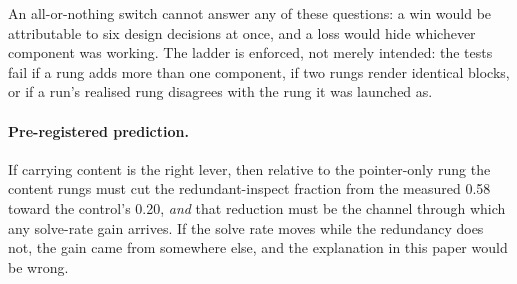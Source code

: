 An all-or-nothing switch cannot answer any of these questions: a win would be
attributable to six design decisions at once, and a loss would hide whichever
component was working. The ladder is enforced, not merely intended: the tests
fail if a rung adds more than one component, if two rungs render identical
blocks, or if a run's realised rung disagrees with the rung it was launched
as\code.

\paragraph{Pre-registered prediction.} If carrying content is the right
lever, then relative to the pointer-only rung the content rungs must cut the
redundant-inspect fraction from the measured \num{0.58} toward the control's
\num{0.20}, \emph{and} that reduction must be the channel through which any
solve-rate gain arrives. If the solve rate moves while the redundancy does
not, the gain came from somewhere else, and the explanation in this paper
would be wrong.

